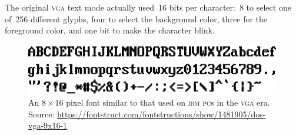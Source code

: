 \documentclass[11pt]{article}
\begin{document}
The original \textsc{vga} text mode actually used~16 bits per
character:~8 to select one of~256 different glyphs, four to select the
background color, three for the foreground color, and one bit to make
the character blink.

\begin{figure}
  \includegraphics[width=\textwidth]{8x16-font.png}
  \caption{An $8 \times 16$ pixel font similar to that used on
    \textsc{ibm} \textsc{pc}s in the \textsc{vga} era.  Source:
  \url{https://fontstruct.com/fontstructions/show/1481905/dos-vga-9x16-1}}
  \label{fig:8x16-font}
\end{figure}

\clearpage
\end{document}
